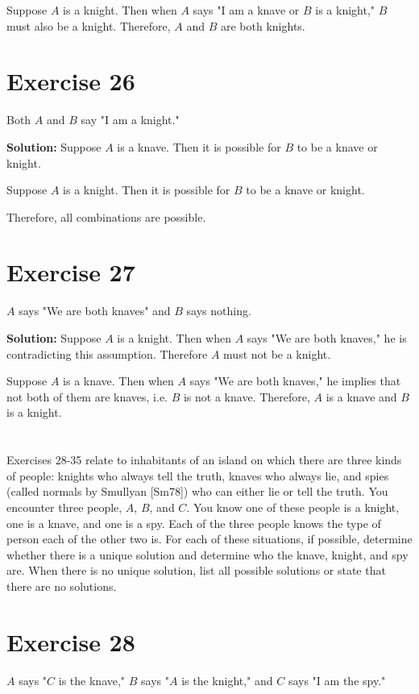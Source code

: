 \documentclass{Axon}
\begin{document}
Suppose \(A\) is a knight. Then when \(A\) says "I am a knave or \(B\) is a knight," \(B\) must also be a knight. Therefore, \(A\) and \(B\) are both knights.

\section*{Exercise 26}
Both \(A\) and \(B\) say "I am a knight."

\noindent
\textbf{Solution:}
Suppose \(A\) is a knave. Then it is possible for \(B\) to be a knave or knight.

Suppose \(A\) is a knight. Then it is possible for \(B\) to be a knave or knight.

Therefore, all combinations are possible.

\section*{Exercise 27}
\(A\) says "We are both knaves" and \(B\) says nothing.

\noindent
\textbf{Solution:}
Suppose \(A\) is a knight. Then when \(A\) says "We are both knaves," he is contradicting this assumption. Therefore \(A\) must not be a knight.

Suppose \(A\) is a knave. Then when \(A\) says "We are both knaves," he implies that not both of them are knaves, i.e. \(B\) is not a knave. Therefore, \(A\) is a knave and \(B\) is a knight.

\section*{}
Exercises 28-35 relate to inhabitants of an island on which there are three kinds of people: knights who always tell the truth, knaves who always lie, and spies (called normals by Smullyan [Sm78]) who can either lie or tell the truth. You encounter three people, \(A\), \(B\), and \(C\). You know one of these people is a knight, one is a knave, and one is a spy. Each of the three people knows the type of person each of the other two is. For each of these situations, if possible, determine whether there is a unique solution and determine who the knave, knight, and spy are. When there is no unique solution, list all possible solutions or state that there are no solutions.

\section*{Exercise 28}
\(A\) says "\(C\) is the knave," \(B\) says "\(A\) is the knight," and \(C\) says "I am the spy."
\end{document}
